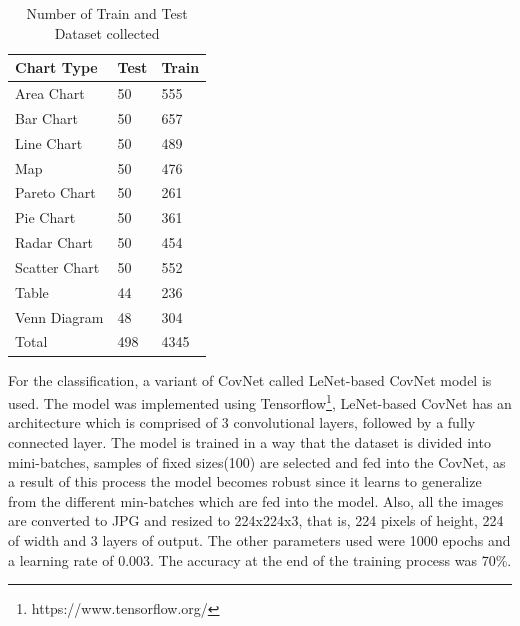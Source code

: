 \documentclass[12pt, a4paper,oneside]{report}
\begin{document}
\begin{table}[h]
	\centering {} \small
	\begin{tabular}{|p{5cm}|p{3cm}|p{3cm}|}
		
		\hline
		Chart Type & Test & Train \\ \hline
		Area Chart & 50 & 555 \\ \hline
		Bar Chart & 50 & 657 \\ \hline
		Line Chart & 50 & 489 \\ \hline
		Map & 50 & 476 \\ \hline
		Pareto Chart & 50 & 261 \\ \hline	
		Pie Chart & 50 & 361 \\ \hline
		Radar Chart & 50 & 454 \\ \hline
		Scatter Chart & 50 & 552 \\ \hline
		Table & 44 & 236 \\ \hline
		Venn Diagram & 48 & 304 \\ \hline
		Total & 498 & 4345 \\ \hline
		
	\end{tabular}
	\caption {Number of Train and Test Dataset collected}	
	\label{table:rela}
	
\end{table}
For the classification, a variant of CovNet called LeNet-based CovNet model is used. The model was implemented using Tensorflow\footnote{https://www.tensorflow.org/}, LeNet-based CovNet has an architecture which is comprised of 3 convolutional layers, followed by a fully connected layer. The model is trained in a way that the dataset is divided into mini-batches, samples of fixed sizes(100) are selected and fed into the CovNet, as a result of this process the model becomes robust since it learns to generalize from the different min-batches which are fed into the model. Also, all the images are converted to JPG and resized to 224x224x3, that is, 224 pixels of height, 224 of width and 3 layers of output. The other parameters used were 1000 epochs and a learning rate of 0.003. The accuracy at the end of the training process was 70\%.
\end{document}
